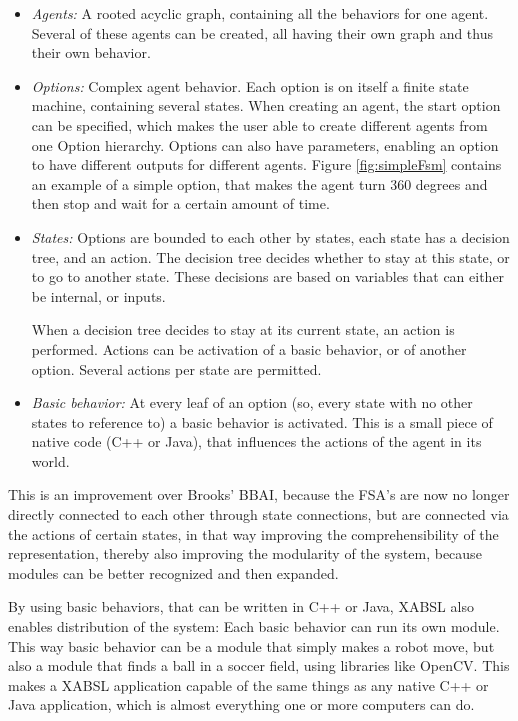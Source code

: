 \documentclass[a4paper,10pt]{article}
\begin{document}
\begin{itemize}
\item \emph{Agents:} A rooted acyclic graph, containing all the behaviors for one
agent. Several of these agents can be created, all having their own graph and
thus their own behavior.
\item \emph{Options:} Complex agent behavior. Each option is on itself a finite
state machine, containing several states. When creating an agent, the start
option can be specified, which makes the user able to create different agents
from one Option hierarchy. Options can also have parameters, enabling an option
to have different outputs for different agents. Figure \ref{fig:simpleFsm}
contains an example of a simple option, that makes the agent turn 360 degrees
and then stop and wait for a certain amount of time.
\item \emph{States:} Options are bounded to each other by states, each state has
a decision tree, and an action. The decision tree decides whether to stay at
this state, or to go to another state. These decisions are based on variables
that can either be internal, or inputs.

When a decision tree decides to stay at its current state, an action is
performed. Actions can be activation of a basic behavior, or of another option.
Several actions per state are permitted.
\item \emph{Basic behavior:} At every leaf of an option (so, every state with no
other states to reference to) a basic behavior is activated. This is a small
piece of native code (C++ or Java), that influences the actions of the agent
in its world. 
\end{itemize}

This is an improvement over Brooks' BBAI, because the FSA's are now no
longer directly connected to each other through state connections, but are
connected via the actions of
certain states, in that way improving the comprehensibility of the
representation, thereby also improving the modularity of the system, because
modules can be better recognized and then expanded.

By using basic behaviors, that can be written in C++ or Java, XABSL also
enables distribution of the system: Each basic behavior can run its own module.
This way basic behavior can be a module that simply makes a robot move, but also a
module that finds a ball in a soccer field, using libraries like OpenCV. This
makes a XABSL application capable of the same things as any native C++ or Java
application, which is almost everything one or more computers can do.
\end{document}
